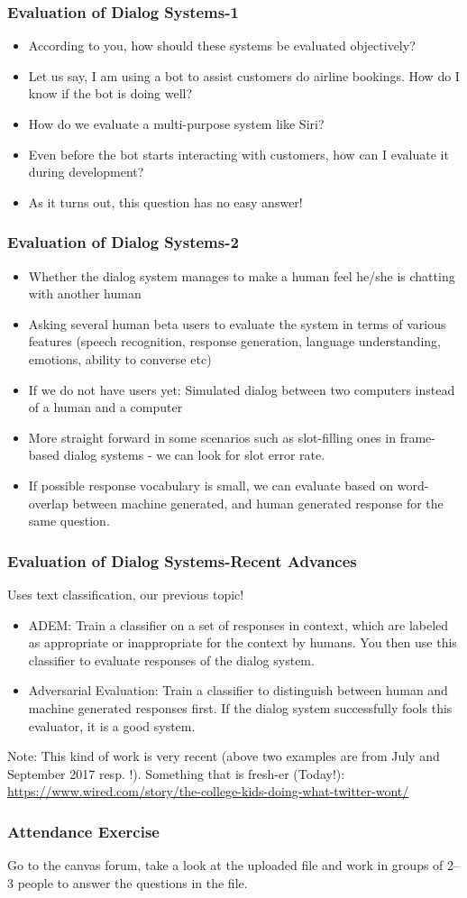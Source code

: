 \documentclass{beamer}
\begin{document}
\begin{frame}
\frametitle{Evaluation of Dialog Systems-1}
\begin{itemize}
\item According to you, how should these systems be evaluated objectively? \pause
\item Let us say, I am using a bot to assist customers do airline bookings. How do I know if the bot is doing well? \pause
\item How do we evaluate a multi-purpose system like Siri? \pause
\item Even before the bot starts interacting with customers, how can I evaluate it during development? \pause
\item As it turns out, this question has no easy answer!
\end{itemize}	
\end{frame}

\begin{frame}
\frametitle{Evaluation of Dialog Systems-2}
\begin{itemize}
\item Whether the dialog system manages to make a human feel he/she is chatting with another human \pause
\item Asking several human beta users to evaluate the system in terms of various features (speech recognition, response generation, language understanding, emotions, ability to converse etc) \pause
\item If we do not have users yet: Simulated dialog between two computers instead of a human and a computer \pause
\item More straight forward in some scenarios such as slot-filling ones in frame-based dialog systems - we can look for slot error rate. \pause
\item If possible response vocabulary is small, we can evaluate based on word-overlap between machine generated, and human generated response for the same question. 
\end{itemize}	
\end{frame}

\begin{frame}
\frametitle{Evaluation of Dialog Systems-Recent Advances}
Uses text classification, our previous topic!
\begin{itemize}
\item ADEM: Train a classifier on a set of responses in context, which are labeled as appropriate or inappropriate for the context by humans. You then use this classifier to evaluate responses of the dialog system. \pause
\item Adversarial Evaluation: Train a classifier to distinguish between human and machine generated responses first. If the dialog system successfully fools this evaluator, it is a good system.
\end{itemize}	
Note: This kind of work is very recent (above two examples are from July and September 2017 resp. !). 
\pause Something that is fresh-er (Today!): \url{https://www.wired.com/story/the-college-kids-doing-what-twitter-wont/}
\end{frame}

\begin{frame}
\frametitle{Attendance Exercise}
Go to the canvas forum, take a look at the uploaded file and work in groups of 2--3 people to answer the questions in the file. 
\end{frame}
\end{document}
